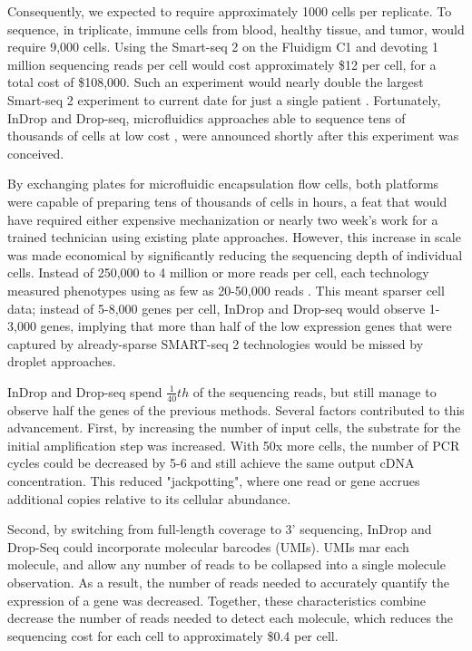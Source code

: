 Consequently, we expected to require approximately 1000 cells per replicate. 
To sequence, in triplicate, immune cells from blood, healthy tissue, and tumor, would require 9,000 cells. 
Using the Smart-seq 2 on the Fluidigm C1 and devoting 1 million sequencing reads per cell would cost approximately \$12 per cell, for a total cost of \$108,000.
Such an experiment would nearly double the largest Smart-seq 2 experiment to current date for just a single patient \citep{Zheng2017}. 
Fortunately, InDrop and Drop-seq, microfluidics approaches able to sequence tens of thousands of cells at low cost \citep{Klein2015,Macosko2015}, were announced shortly after this experiment was conceived. 

By exchanging plates for microfluidic encapsulation flow cells, both platforms were capable of preparing tens of thousands of cells in hours, a feat that would have required either expensive mechanization or nearly two week’s work for a trained technician using existing plate approaches. 
However, this increase in scale was made economical by significantly reducing the sequencing depth of individual cells.
Instead of 250,000 to 4 million or more reads per cell, each technology measured phenotypes using as few as 20-50,000 reads \citep{Klein2015,Macosko2015}.
This meant sparser cell data; instead of 5-8,000 genes per cell, InDrop and Drop-seq would observe 1-3,000 genes, implying that more than half of the low expression genes that were captured by already-sparse SMART-seq 2 technologies would be missed by droplet approaches.  

InDrop and Drop-seq spend $\frac{1}{40}th$ of the sequencing reads, but still manage to observe half the genes of the previous methods. 
Several factors contributed to this advancement. 
First, by increasing the number of input cells, the substrate for the initial amplification step was increased. With 50x more cells, the number of PCR cycles could be decreased by 5-6 and still achieve the same output cDNA concentration.
This reduced "jackpotting", where one read or gene accrues additional copies relative to its cellular abundance. 

Second, by switching from full-length coverage to 3' sequencing, InDrop and Drop-Seq could incorporate molecular barcodes (UMIs). 
UMIs mar each molecule, and allow any number of reads to be collapsed into a single molecule observation. 
As a result, the number of reads needed to accurately quantify the expression of a gene was decreased. 
Together, these characteristics combine decrease the number of reads needed to detect each molecule, which reduces the sequencing cost for each cell to approximately \$0.4 per cell.

